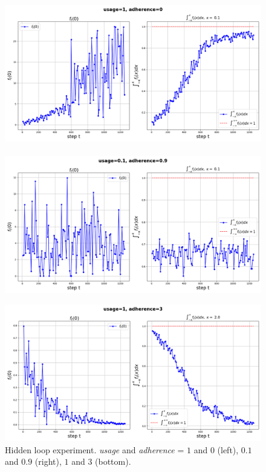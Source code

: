 \documentclass{article}
\begin{document}
        \begin{figure}[h!]
            \centering
            \includegraphics[width=0.49\linewidth]{pictures/ft0_loop_1_0.png}~~
            ~~\includegraphics[width=0.49\linewidth]{pictures/ft0_loop_0.1_0.9.png}
            
            \includegraphics[width=0.49\linewidth]{pictures/ft0_loop_1_3.png}
            
            \caption{Hidden loop experiment. \textit{usage} and \textit{adherence} = $1$ and $0$ (left), $0.1$ and $0.9$ (right), $1$ and $3$ (bottom).}
            \label{delta_loop}
        \end{figure}

\newpage
\end{document}
